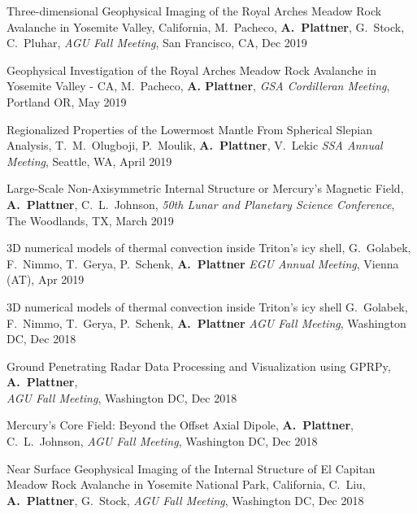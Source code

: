 \documentclass[10pt]{article}
\begin{document}
\spcp Three-dimensional Geophysical Imaging of the Royal Arches Meadow
Rock Avalanche in Yosemite Valley, California, M.~Pacheco,
\textbf{A.~Plattner}, G.~Stock, C.~Pluhar, \emph{AGU Fall Meeting},
San Francisco, CA, Dec 2019

\spcp Geophysical Investigation of the Royal Arches Meadow Rock
Avalanche in Yosemite Valley - CA,
M.~Pacheco, \textbf{A. Plattner},
\emph{GSA Cordilleran Meeting}, Portland OR, May 2019

\spcp
Regionalized Properties of the Lowermost Mantle From Spherical Slepian Analysis,
T.~M.~Olugboji, P.~Moulik, \textbf{A.~Plattner}, V.~Lekic
\emph{SSA Annual Meeting}, Seattle, WA, April 2019

\spcp
Large-Scale Non-Axisymmetric Internal Structure or Mercury's Magnetic Field,
\textbf{A.~Plattner}, C.~L.~Johnson, \emph{50th Lunar and Planetary Science Conference},
The Woodlands, TX, March 2019

\spcp 3D numerical models of thermal convection inside Triton’s icy
shell, G.~Golabek, F.~Nimmo, T.~Gerya, P.~Schenk, \textbf{A.~Plattner}
\emph{EGU Annual Meeting}, Vienna (AT), Apr 2019

\spcp
3D numerical models of thermal convection inside Triton's icy shell
G.~Golabek, F.~Nimmo, T.~Gerya, P.~Schenk, \textbf{A.~Plattner}
\emph{AGU Fall Meeting}, Washington DC, Dec 2018

\spcp
Ground Penetrating Radar Data Processing and Visualization using
GPRPy,
\textbf{A.~Plattner},\\
\emph{AGU Fall Meeting}, Washington DC, Dec 2018

\spcp
Mercury's Core Field: Beyond the Offset Axial Dipole,
\textbf{A.~Plattner}, C.~L.~Johnson, 
\emph{AGU Fall Meeting}, Washington DC, Dec 2018 

\spcp
Near Surface Geophysical Imaging of the Internal
Structure of El Capitan Meadow Rock Avalanche in Yosemite National
Park, California,
C.~Liu, \textbf{A.~Plattner}, G.~Stock,
\emph{AGU Fall Meeting}, Washington DC, Dec 2018
\end{document}
